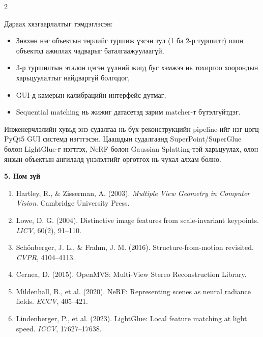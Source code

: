 \begin{multicols}{2}

Дараах хязгаарлалтыг тэмдэглэсэн:
\begin{itemize}
    \item Зөвхөн нэг объектын төрлийг туршиж үзсэн тул (1 ба 2-р туршилт) олон объектод ажиллах чадварыг баталгаажуулаагүй,
    \item 3-р туршилтын эталон цэгэн үүлний жигд бус хэмжээ нь тохиргоо хоорондын харьцуулалтыг найдваргүй болгодог,
    \item GUI-д камерын калибрацийн интерфейс дутмаг,
    \item Sequential matching нь жижиг датасетэд зарим matcher-т бүтэлгүйтдэг.
\end{itemize}

Инженерчлэлийн хувьд энэ судалгаа нь бүх реконструкцийн pipeline-ийг нэг цогц PyQt5 GUI системд нэгтгэсэн. Цаашдын судалгаанд SuperPoint/SuperGlue болон LightGlue-г нэгтгэх, NeRF болон Gaussian Splatting-тэй харьцуулах, олон янзын объектын ангилалд үнэлэлтийг өргөтгөх нь чухал алхам болно.

\noindent\textbf{5. Ном зүй}
\small
\begin{enumerate}
\setlength{\itemsep}{1pt}\setlength{\parsep}{0pt}\setlength{\topsep}{2pt}
    \item Hartley, R., \& Zisserman, A. (2003). \textit{Multiple View Geometry in Computer Vision}. Cambridge University Press.
    \item Lowe, D. G. (2004). Distinctive image features from scale-invariant keypoints. \textit{IJCV}, 60(2), 91--110.
    \item Sch{\"o}nberger, J. L., \& Frahm, J. M. (2016). Structure-from-motion revisited. \textit{CVPR}, 4104--4113.
    \item Cernea, D. (2015). OpenMVS: Multi-View Stereo Reconstruction Library.
    \item Mildenhall, B., et al. (2020). NeRF: Representing scenes as neural radiance fields. \textit{ECCV}, 405--421.
    \item Lindenberger, P., et al. (2023). LightGlue: Local feature matching at light speed. \textit{ICCV}, 17627--17638.
\end{enumerate}
\normalsize

\end{multicols}
